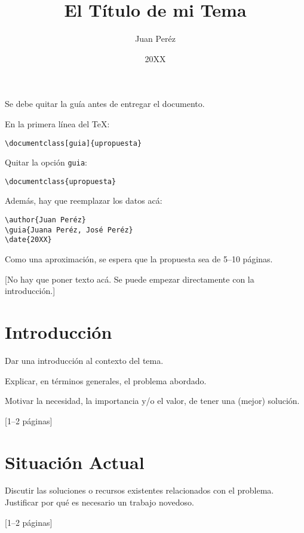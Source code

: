 \documentclass[guia]{upropuesta}
\title{El Título de mi Tema}
\author{Juan Peréz}
\date{20XX}
\begin{document}
\maketitle

\begin{pauta}
Se debe quitar la guía antes de entregar el documento.

En la primera línea del \TeX: 

\begin{verbatim}
\documentclass[guia]{upropuesta}
\end{verbatim}

Quitar la opción \texttt{guia}:

\begin{verbatim}
\documentclass{upropuesta}
\end{verbatim}

Además, hay que reemplazar los datos acá:

\begin{verbatim}
\author{Juan Peréz}
\guia{Juana Peréz, José Peréz}
\date{20XX}
\end{verbatim}

Como una aproximación, se espera que la propuesta sea de 5--10 páginas.

[No hay que poner texto acá. Se puede empezar directamente con la introducción.]
\end{pauta}

\section{Introducción}\label{sec:intro}

\begin{pauta}
Dar una introducción al contexto del tema.

Explicar, en términos generales, el problema abordado.

Motivar la necesidad, la importancia y/o el valor, de tener una (mejor) solución.

[1--2 páginas]
\end{pauta}

\section{Situación Actual}\label{sec:sa}

\begin{pauta}
Discutir las soluciones o recursos existentes relacionados con el problema. Justificar por qué es necesario un trabajo novedoso.

[1--2 páginas]
\end{pauta}
\end{document}
